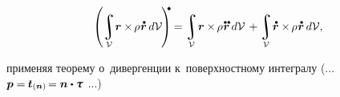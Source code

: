 \begin{otherlanguage}{russian}
\nopagebreak\vspace{-0.2em}\begin{equation*}
\displaystyle\left( \integral\displaylimits_{\mathcal{V}} \hspace{-0.4ex} \currentlocationvector \times \hspace{-0.2ex} \rho \hspace{.1ex} \mathdotabove{\currentlocationvector} \hspace{.4ex} d\mathcal{V} \hspace{-0.2ex} \right)^{\hspace{-0.32em}\tikz[baseline=-0.2ex]\draw[black, fill=black] (0,0) circle (.28ex);} \hspace{-0.1ex}
=
\integral\displaylimits_{\mathcal{V}} \hspace{-0.32ex} \currentlocationvector \times \hspace{-0.2ex} \rho \hspace{.1ex} \mathdotdotabove{\currentlocationvector} \hspace{.4ex} d\mathcal{V}
\hspace{.3ex} +
\integral\displaylimits_{\mathcal{V}} \hspace{-0.32ex} \tikzmark{RdotCrossRdotBegin} \mathdotabove{\currentlocationvector} \times \hspace{-0.2ex} \rho \hspace{.1ex} \mathdotabove{\currentlocationvector} \hspace{.1ex} \tikzmark{RdotCrossRdotEnd} \hspace{.3ex} d\mathcal{V} ,
\end{equation*}

\vspace{-0.6em}
\noindent применяя теорему о~дивергенции к~поверхностному интегралу
(... ${\bm{p} = \hspace{-0.1ex} \tractionvector{\currentunitnormal} \hspace{-0.1ex} = \currentunitnormal \dotp \cauchystress}$ ...)


\end{otherlanguage}
